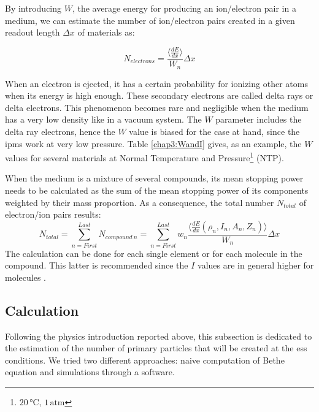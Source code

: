 \begin{refsection}
  By introducing \(W\), the average energy for producing an ion/electron pair in a medium, we can estimate the number of ion/electron pairs created in a given readout length $\Delta x$ of materials \cite{Weiss1955,Bichsel1979} as:

  \begin{equation}
    N_{electrons}= \frac{\big \langle \frac{dE}{dx} \big \rangle}{W_{n}} \Delta x
  \end{equation}

  When an electron is ejected, it has a certain probability for ionizing other atoms when its energy is high enough. These secondary electrons are called delta rays or delta electrons. This phenomenon becomes rare and negligible when the medium has a very low density like in a vacuum system. The \(W\) parameter includes the delta ray electrons, hence the \(W\) value is biased \cite[p. 470]{Tanabashi2018} for the case at hand, since the \acrshort{ipm}s work at very low pressure. Table \ref{chap3:WandI} gives, as an example, the \(W\) values for several materials at Normal Temperature and Pressure\footnote{$20\,\mathrm{°C}$, $1\,\mathrm{atm}$} (NTP).

  

  When the medium is a mixture of several compounds, its mean stopping power needs to be calculated as the sum of the mean stopping power of its components weighted by their mass proportion. As a consequence, the total number $N_{total}$ of electron/ion pairs results:
  \begin{equation}
    N_{total}= \sum_{n= First}^{Last} N_{compound\ n}= \sum_{n= First}^{Last} w_{n} \frac{\big \langle \frac{dE}{dx}\left(\rho_{n},I_{n},A_{n},Z_{n}\right) \big \rangle}{W_{n}} \Delta x
  \end{equation}
  The calculation can be done for each single element or for each molecule in the compound.
  This latter is recommended since the \(I\) values are in general higher for molecules \cite[p. 451]{Tanabashi2018}.

  \subsection{Calculation}
  \label{chap3:calc}
  Following the physics introduction reported above, this subsection is dedicated to the estimation of the number of primary particles that will be created at the \acrshort{ess} conditions. We tried two different approaches: naive computation of Bethe equation and simulations through a software.


\end{refsection}
